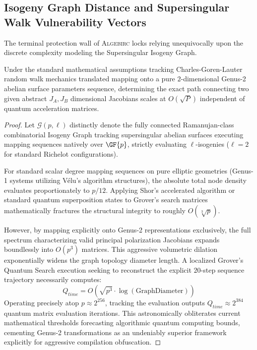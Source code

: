\subsection{Isogeny Graph Distance and Supersingular Walk Vulnerability Vectors}
The terminal protection wall of \textsc{Algebirc} locks relying unequivocally upon the discrete complexity modeling the Supersingular Isogeny Graph.

\begin{theorem}
Under the standard mathematical assumptions tracking Charles-Goren-Lauter random walk mechanics translated mapping onto a pure $2$-dimensional Genus-2 abelian surface parameters sequence, determining the exact path connecting two given abstract $J_A, J_B$ dimensional Jacobians scales at $O(\sqrt{P})$ independent of quantum acceleration matrices.
\end{theorem}
\begin{proof}
Let $\mathcal{G}(p, \ell)$ distinctly denote the fully connected Ramanujan-class combinatorial Isogeny Graph tracking supersingular abelian surfaces executing mapping sequences natively over $\GF{p}$, strictly evaluating $\ell$-isogenies ($\ell=2$ for standard Richelot configurations).

For standard scalar degree mapping sequences on pure elliptic geometries (Genus-1 systems utilizing Vélu's algorithm structures), the absolute total node density evaluates proportionately to $p/12$. Applying Shor’s accelerated algorithm or standard quantum superposition states to Grover’s search matrices mathematically fractures the structural integrity to roughly $O(\sqrt[3]{p})$.

However, by mapping explicitly onto Genus-2 representations exclusively, the full spectrum characterizing valid principal polarization Jacobians expands boundlessly into $O(p^3)$ matrices.
This aggressive volumetric dilation exponentially widens the graph topology diameter length. 
A localized Grover’s Quantum Search execution seeking to reconstruct the explicit $20$-step sequence trajectory necessarily computes:
\begin{equation}
    Q_{time} = O\left( \sqrt{p^3} \cdot \log(\text{GraphDiameter}) \right)
\end{equation}
Operating precisely atop $p \approx 2^{256}$, tracking the evaluation outputs $Q_{time} \approx 2^{384}$ quantum matrix evaluation iterations. This astronomically obliterates current mathematical thresholds forecasting algorithmic quantum computing bounds, cementing Genus-2 transformations as an undeniably superior framework explicitly for aggressive compilation obfuscation.
\end{proof}

